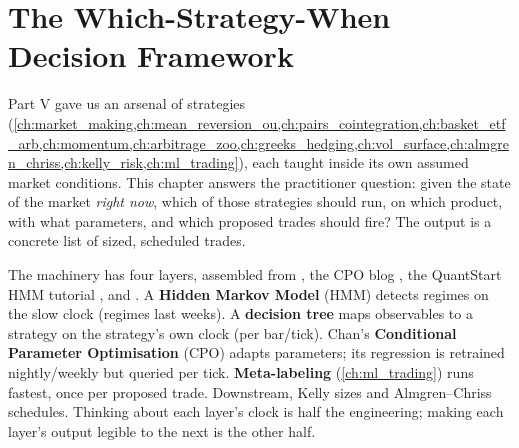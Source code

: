 \chapter{The Which-Strategy-When Decision Framework}
\label{ch:which_strategy_when}

Part V gave us an arsenal of strategies
(\cref{ch:market_making,ch:mean_reversion_ou,ch:pairs_cointegration,ch:basket_etf_arb,ch:momentum,ch:arbitrage_zoo,ch:greeks_hedging,ch:vol_surface,ch:almgren_chriss,ch:kelly_risk,ch:ml_trading}),
each taught inside its own assumed market conditions. This chapter
answers the practitioner question: given the state of the market
\emph{right now}, which of those strategies should run, on which
product, with what parameters, and which proposed trades should
fire? The output is a concrete list of sized, scheduled trades.

The machinery has four layers, assembled from \citeChanQT, the CPO
blog \citep{chan2020cpo}, the QuantStart HMM tutorial
\citep{quantstart2016hmm}, and \citeAFML. A \textbf{Hidden Markov
Model} (HMM) detects regimes on the slow clock (regimes last
weeks). A \textbf{decision tree} maps observables to a strategy on
the strategy's own clock (per bar/tick). Chan's \textbf{Conditional
Parameter Optimisation} (CPO) adapts parameters; its regression
is retrained nightly/weekly but queried per tick.
\textbf{Meta-labeling} (\cref{ch:ml_trading}) runs fastest, once
per proposed trade. Downstream, Kelly sizes and Almgren--Chriss
schedules. Thinking about each layer's clock is half the
engineering; making each layer's output legible to the next is the
other half.

